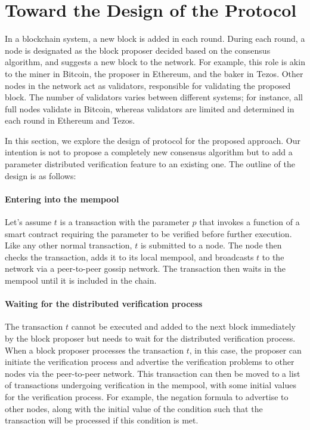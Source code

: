 \documentclass[runningheads]{llncs}
\begin{document}
\section{Toward the Design of the Protocol}
\label{sec:design}
In a blockchain system, a new block is added in each round. During each round, a node is designated as the block proposer decided based on the consensus algorithm, and suggests a new block to the network. For example, this role is akin to the miner in Bitcoin, the proposer in Ethereum, and the baker in Tezos. Other nodes in the network act as validators, responsible for validating the proposed block. The number of validators varies between different systems; for instance, all full nodes validate in Bitcoin, whereas validators are limited and determined in each round in Ethereum and Tezos.

In this section, we explore the design of protocol for the proposed approach. Our intention is not to propose a completely new consensus algorithm but to add a parameter distributed verification feature to an existing one. The outline of the design is as follows:
\paragraph{Entering into the mempool} Let's assume $t$ is a transaction with the parameter $p$ that invokes a function of a smart contract requiring the parameter to be verified before further execution. Like any other normal transaction, $t$ is submitted to a node. The node then checks the transaction, adds it to its local mempool, and broadcasts $t$ to the network via a peer-to-peer gossip network. The transaction then waits in the mempool until it is included in the chain.
\paragraph{Waiting for the distributed verification process} The transaction $t$ cannot be executed and added to the next block immediately by the block proposer but needs to wait for the distributed verification process. When a block proposer processes the transaction $t$, in this case, the proposer can initiate the verification process and advertise the verification problems to other nodes via the peer-to-peer network. This transaction can then be moved to a list of transactions undergoing verification in the mempool, with some initial values for the verification process. For example, the negation formula to advertise to other nodes, along with the initial value of the condition such that the transaction will be processed if this condition is met.
\end{document}
